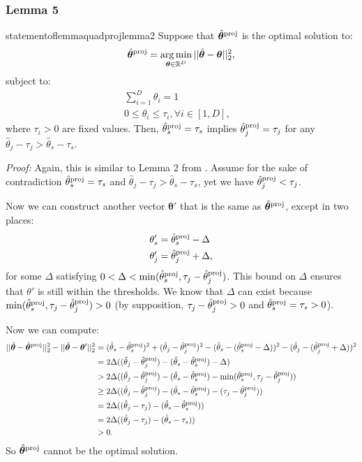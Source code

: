 \documentclass{article} %
\newcommand{\bmthproj}{\hat{\bm{\theta}}^{\textnormal{proj}}}
\newcommand{\thproj}{\hat{\theta}^{\textnormal{proj}}}
\begin{document}
\subsubsection{Lemma 5}
\begin{restatable}{statementoflemma}{quadprojlemma2}
\label{quad_lemma2}
Suppose that $\bmthproj$ is the optimal solution to:
\[
\bmthproj = \argmin_{\bm{\theta}\in\mathbb{R}^D} ||\hat{\bm{\theta}}-\bm{\theta}||_2^2,
\]
subject to:
\begin{align*}
\sum_{i=1}^D \theta_i = 1&\\
0 \leq \theta_i \leq \tau_i, \forall i \in [1,D],
\end{align*}
where $\tau_i>0$ are fixed values.
Then, $\thproj_s = \tau_s$ implies $\thproj_j = \tau_j$ for any $\hat{\theta}_j-\tau_j > \hat{\theta}_s-\tau_s$.
\end{restatable}

\textit{Proof:} Again, this is similar to Lemma 2 from \citet{shalev2006efficient}. Assume for the sake of contradiction $\thproj_s = \tau_s$ and $\hat{\theta}_j-\tau_j > \hat{\theta}_s-\tau_s$, yet we have $\thproj_j < \tau_j$.

Now we can construct another vector $\bm{\theta}'$ that is the same as $\bmthproj$, except in two places:
\begin{align*}
\theta'_s &= \thproj_s - \Delta\\
\theta'_j &= \thproj_j + \Delta,
\end{align*}
for some $\Delta$ satisfying $0 < \Delta < \min(\thproj_s, \tau_j-\thproj_j)$. This bound on $\Delta$ ensures that $\theta'$ is still within the thresholds. We know that $\Delta$ can exist because $\min(\thproj_s, \tau_j-\thproj_j) > 0$ (by supposition, $\tau_j-\thproj_j > 0$ and $\thproj_s=\tau_s>0$).

Now we can compute:
\begin{align*}
||\hat{\bm{\theta}}-\bmthproj||^2_2 - ||\hat{\bm{\theta}}-\bm{\theta}'||^2_2 &= (\hat{\theta}_s - \thproj_s)^2 + (\hat{\theta}_j - \thproj_j)^2 - (\hat{\theta}_s - (\thproj_s - \Delta))^2 - (\hat{\theta}_j - (\thproj_j + \Delta))^2\\
&= 2\Delta((\hat{\theta}_j - \thproj_j) - (\hat{\theta}_s - \thproj_s) - \Delta)\\
&> 2\Delta((\hat{\theta}_j - \thproj_j) - (\hat{\theta}_s - \thproj_s) - \min(\thproj_s, \tau_j - \thproj_j))\\
&\geq 2\Delta((\hat{\theta}_j - \thproj_j) - (\hat{\theta}_s - \thproj_s) - (\tau_j - \thproj_j))\\
&= 2\Delta((\hat{\theta}_j - \tau_j) - (\hat{\theta}_s - \thproj_s))\\
&= 2\Delta((\hat{\theta}_j - \tau_j) - (\hat{\theta}_s - \tau_s))\\
&> 0.
\end{align*}
So $\bmthproj$ cannot be the optimal solution.
\end{document}
